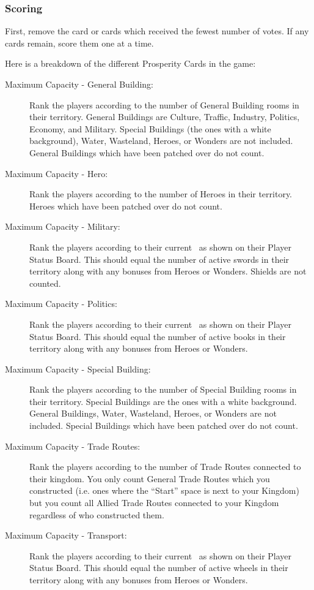 \documentclass[10pt,twocolumn]{article}
\begin{document}
\subsubsection{Scoring}
First, remove the card or cards which received the fewest number of votes. If any cards remain, score them one at a time.

Here is a breakdown of the different Prosperity Cards in the game:
\begin{description}
\item[Maximum Capacity - General Building:] Rank the players according to the number of General Building rooms in their territory. General Buildings are Culture, Traffic, Industry, Politics, Economy, and Military. Special Buildings (the ones with a white background), Water, Wasteland, Heroes, or Wonders are not included. General Buildings which have been patched over do not count.
\item[Maximum Capacity - Hero:] Rank the players according to the number of Heroes in their territory. Heroes which have been patched over do not count.
\item[Maximum Capacity - Military:] Rank the players according to their current \mil\ as shown on their Player Status Board. This should equal the number of active swords in their territory along with any bonuses from Heroes or Wonders. Shields are not counted.
\item[Maximum Capacity - Politics:] Rank the players according to their current \pol\ as shown on their Player Status Board. This should equal the number of active books in their territory along with any bonuses from Heroes or Wonders.
\item[Maximum Capacity - Special Building:] Rank the players according to the number of Special Building rooms in their territory. Special Buildings are the ones with a white background. General Buildings, Water, Wasteland, Heroes, or Wonders are not included. Special Buildings which have been patched over do not count.
\item[Maximum Capacity - Trade Routes:] Rank the players according to the number of Trade Routes connected to their kingdom. You only count General Trade Routes which you constructed (i.e. ones where the ``Start'' space is next to your Kingdom) but you count all Allied Trade Routes connected to your Kingdom regardless of who constructed them.
\item[Maximum Capacity - Transport:] Rank the players according to their current \tra\ as shown on their Player Status Board. This should equal the number of active wheels in their territory along with any bonuses from Heroes or Wonders.

\end{description}
\end{document}
